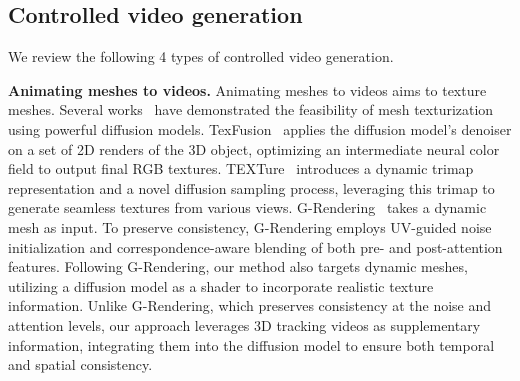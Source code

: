 

\subsection{Controlled video generation}
We review the following 4 types of controlled video generation.

\textbf{Animating meshes to videos.}
Animating meshes to videos aims to texture meshes. Several works~\cite{cao2023texfusion,richardson2023texture,wang2023breathing,cai2024generative} have demonstrated the feasibility of mesh texturization using powerful diffusion models.
TexFusion~\cite{cao2023texfusion} applies the diffusion model’s denoiser on a set of 2D renders of the 3D object, optimizing an intermediate neural color field to output final RGB textures. 
TEXTure~\cite{richardson2023texture} introduces a dynamic trimap representation and a novel diffusion sampling process, leveraging this trimap to generate seamless textures from various views. 
G-Rendering~\cite{cai2024generative} takes a dynamic mesh as input. To preserve consistency, G-Rendering employs UV-guided noise initialization and correspondence-aware blending of both pre- and post-attention features. Following G-Rendering, our method also targets dynamic meshes, utilizing a diffusion model as a shader to incorporate realistic texture information. Unlike G-Rendering, which preserves consistency at the noise and attention levels, our approach leverages 3D tracking videos as supplementary information, integrating them into the diffusion model to ensure both temporal and spatial consistency.

